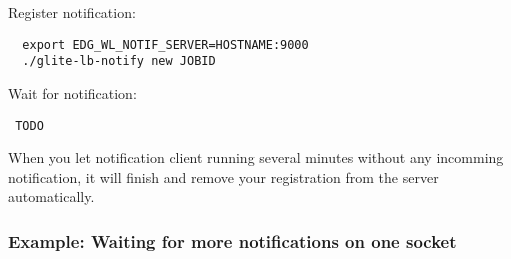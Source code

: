 Register notification:
\begin{verbatim}
  export EDG_WL_NOTIF_SERVER=HOSTNAME:9000
  ./glite-lb-notify new JOBID
\end{verbatim}

Wait for notification:
\begin{verbatim}
 TODO
\end{verbatim}

When you let notification client running several minutes without any incomming notification, it will finish and remove your registration from the server automatically.

\subsubsection{Example: Waiting for more notifications on one socket}

